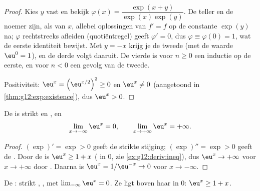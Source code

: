 \begin{proof}
Kies $y$ vast en bekijk $\varphi(x) = \dfrac{\exp(x+y)}{\exp(x)\exp(y)}$. De
teller en de noemer zijn, als  van $x$, allebei oplossingen van
$f' = f$ op de constante $\exp(y)$ na; $\varphi$ rechtstreeks afleiden
(quotiëntregel) geeft $\varphi' = 0$, dus $\varphi \equiv \varphi(0) = 1$,
wat de eerste identiteit bewijst. Met $y = -x$ krijg je de tweede (met de
waarde $\eu^0 = 1$), en de derde volgt daaruit. De vierde is voor $n \geq 0$
een inductie op de eerste, en voor $n < 0$ een gevolg van de tweede.

Positiviteit: $\eu^x = \left(\eu^{x/2}\right)^2 \geq 0$ en $\eu^x \neq 0$
(aangetoond in \cref{thm:g12:exp:existence}), dus $\eu^x > 0$.
\end{proof}

\begin{proposition}\label{prop:g12:exp:variations}
De  is strikt  en , en
\[
\lim_{x\to-\infty} \eu^x = 0, \qquad
\lim_{x\to+\infty} \eu^x = +\infty .
\]
\end{proposition}

\begin{proof}
$(\exp)' = \exp > 0$ geeft de strikte stijging; $(\exp)'' = \exp > 0$ geeft
de . Door de  is $\eu^x \geq 1 + x$ ( in $0$,
zie \cref{ex:g12:deriv:ineq}), dus $\eu^x \to +\infty$ voor $x \to +\infty$
door . Daarna is $\eu^{x} = 1/\eu^{-x} \to 0$ voor
$x \to -\infty$.
\end{proof}

\begin{omfigure}

{\small De : strikt , , met
$\lim_{-\infty} \eu^x = 0$. Ze ligt boven haar  in $0$:
$\eu^x \geq 1 + x$.}
\end{omfigure}

